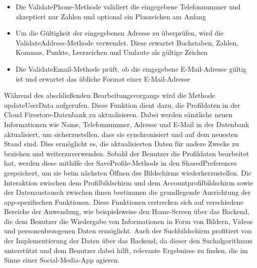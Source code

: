 \begin{itemize}[itemsep=0pt]
    \item{Die ValidatePhone-Methode validiert die eingegebene Telefonnummer und akzeptiert nur Zahlen und optional ein Pluszeichen am Anfang}
\end{itemize}
\begin{itemize}[itemsep=0pt]
    \item{Um die Gültigkeit der eingegebenen Adresse zu überprüfen, wird die ValidateAddress-Methode verwendet. Diese erwartet Buchstaben, Zahlen, Kommas, Punkte, Leerzeichen und Umlaute als gültige Zeichen} 
\end{itemize}
\begin{itemize}[itemsep=0pt]
	\item{Die ValidateEmail-Methode prüft, ob die eingegebene E-Mail-Adresse gültig ist und erwartet das übliche Format einer E-Mail-Adresse}
\end{itemize}
Während des abschließenden Bearbeitungsvorgangs wird die Methode updateUserData aufgerufen. Diese Funktion dient dazu, die Profildaten in der Cloud Firestore-Datenbank zu aktualisieren. Dabei werden sämtliche neuen Informationen wie Name, Telefonnummer, Adresse und E-Mail in der Datenbank aktualisiert, um sicherzustellen, dass sie synchronisiert und auf dem neuesten Stand sind. Dies ermöglicht es, die aktualisierten Daten für andere Zwecke zu beziehen und weiterzuverwenden. Sobald der Benutzer die Profildaten bearbeitet hat, werden diese mithilfe der SaveProfile-Methode in den SharedPreferences gespeichert, um sie beim nächsten Öffnen des Bildschirms wiederherzustellen.  Die Interaktion zwischen dem Profilbildschirm und dem Accountprofilbildschirm sowie der Datenaustausch zwischen ihnen bestimmen die grundlegende Ausrichtung der app-spezifischen Funktionen. Diese Funktionen erstrecken sich auf verschiedene Bereiche der Anwendung, wie beispielsweise den Home-Screen über das Backend, die dem Benutzer die Wiedergabe von Informationen in Form von Bildern, Videos und personenbezogenen Daten ermöglicht. Auch der Suchbildschirm profitiert von der Implementierung der Daten über das Backend, da dieser den Suchalgorithmus unterstützt und dem Benutzer dabei hilft, relevante Ergebnisse zu finden, die im Sinne einer Social-Media-App agieren.


